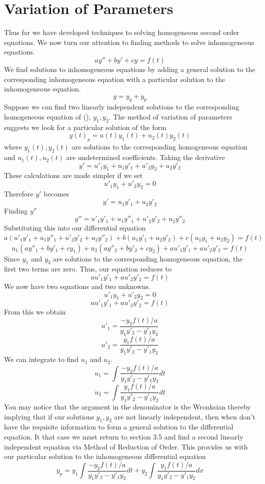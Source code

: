 \section{Variation of Parameters}
Thus far we have developed techniques to solving homogeneous second order equations. We now turn our attention to finding methods to solve inhomogeneous equations.
\[ay''+by'+cy = f(t)\]
We find solutions to inhomogeneous equations by adding a general solution to the corresponding inhomogeneous equation with a particular solution to the inhomogeneous equation. 
\[y = y_g + y_p\]
Suppose we can find two linearly independent solutions to the corresponding homogeneous equation of (), $y_1, y_2$. The method of variation of parameters suggests we look for a particular solution of the form
\[y(t)_p = u(t)y_1(t)+u_2(t)y_2(t)\]
where $y_1(t), y_2(t)$ are solutions to the corresponding homogeneous equation and $u_1(t), u_2(t)$ are undetermined coefficients. 
Taking the derivative
\[y' = u'_1y_1+u_1y'_1 + u'_2y_2+u_2y'_2\]
These calculations are made simpler if we set 
\[u'_1y_1 + u'_2y_2 = 0 \]
Therefore $y'$ becomes
\[y' = u_1y'_1 + u_2y'_2 \]
Finding $y''$
\[y'' = u'_1y'_1 + u_1y''_1 + u'_2y'_2+u_2y''_2\]
Substituting this into our differential equation
\[a(u'_1y'_1 + u_1y''_1 + u'_2y'_2+u_2y''_2)+ b(u_1y'_1 + u_2y'_2 )+c(u_1y_1 + u_2y_2) = f(t)\]
\[u_1(ay''_1 + by'_1+cy_1) + u_2(ay''_2 + by'_2+cy_2) + au'_1y'_1+au'_2y'_2 = f(t) \]
Since $y_1$ and $y_2$ are solutions to the corresponding homogeneous equation, the first two terms are zero. Thus, our equation reduces to
\[au'_1y'_1+au'_2y'_2 = f(t)\]
We now have two equations and two unknowns.
\[u'_1y_1 + u'_2y_2 = 0 \]
\[au'_1y'_1+au'_2y'_2 = f(t)\]
From this we obtain
\[u'_1 = \frac{-y_2f(t)/a}{y_1y'_2 - y'_1y_2}\]
\[u'_2 = \frac{y_1f(t)/a}{y_1y'_2 - y'_1y_2}\]
We can integrate to find $u_1$ and $u_2$.
\[u_1 = \int \frac{-y_2f(t)/a}{y_1y'_2 - y'_1y_2} dt\]
\[u_2 = \int \frac{y_1f(t)/a}{y_1y'_2 - y'_1y_2} dt \]
You may notice that the argument in the denominator is the Wronksian thereby implying that if our solutions $y_1, y_2$ are not linearly independent, then when don't have the requisite information to form a general solution to the differential equation. It that case we must return to section 3.5 and find a second linearly independent equation via Method of Reduction of Order. 
\linebreak
\linebreak
This provides us with our particular solution to the inhomogeneous differential equation
\[y_p = y_1\int \frac{-y_2f(t)/a}{y_1y'_2 - y'_1y_2} dt + y_2\int \frac{y_1f(t)/a}{y_1y'_2 - y'_1y_2} dx\]
